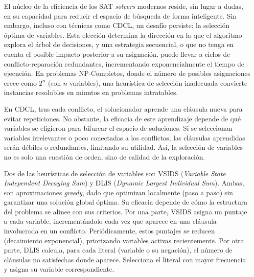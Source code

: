 
El núcleo de la eficiencia de los SAT \textit{solvers} modernos reside, sin lugar a dudas, en su capacidad para reducir el espacio de búsqueda de forma inteligente. Sin embargo, incluso con técnicas como CDCL, un desafío persiste: la selección óptima de variables. Esta elección determina la dirección en la que el algoritmo explora el árbol de decisiones, y una estrategia secuencial, o que no tenga en cuenta el posible impacto posterior a su asignaci\'on, puede llevar a ciclos de conflicto-reparación redundantes, incrementando exponencialmente el tiempo de ejecución. En problemas NP-Completos, donde el número de posibles asignaciones crece como $2^n$ (con $n$ variables), una heurística de selección inadecuada convierte instancias resolubles en minutos en problemas intratables.

En CDCL, tras cada conflicto, el solucionador aprende una cláusula nueva para evitar repeticiones. No obstante, la eficacia de este aprendizaje depende de qué variables se eligieron para bifurcar el espacio de soluciones. Si se seleccionan variables irrelevantes o poco conectadas a los conflictos, las cláusulas aprendidas serán débiles o redundantes, limitando su utilidad. Así, la selección de variables no es solo una cuestión de orden, sino de calidad de la exploración.

Dos de las heurísticas de selección de variables son VSIDS (\textit{Variable State Independent Decaying Sum}) y DLIS (\textit{Dynamic Largest Individual Sum}). Ambas, son aproximaciones \textit{greedy}, dado que optimizan localmente (paso a paso) sin garantizar una solución global óptima. Su eficacia depende de cómo la estructura del problema se alinee con sus criterios. Por una parte, VSIDS asigna un puntaje a cada variable, incrementándolo cada vez que aparece en una cláusula involucrada en un conflicto. Periódicamente, estos puntajes se reducen (decaimiento exponencial), priorizando variables activas recientemente. Por otra parte, DLIS calcula, para cada literal (variable o su negación), el número de cláusulas no satisfechas donde aparece. Selecciona el literal con mayor frecuencia y asigna su variable correspondiente.

